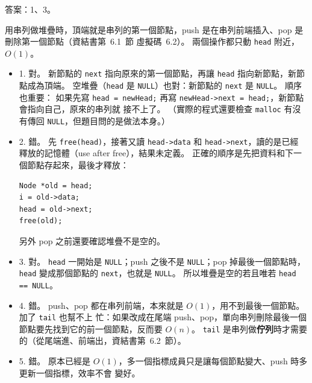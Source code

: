 \begin{pastsoln}
答案：1、3。

用串列做堆疊時，頂端就是串列的第一個節點，push 是在串列前端插入、pop 是刪除第一個節點（資結書第~6.1~節
虛擬碼~6.2）。 兩個操作都只動 \texttt{head} 附近，$O(1)$。

\begin{itemize}
\item 1. 對。 新節點的 \texttt{next} 指向原來的第一個節點，再讓 \texttt{head} 指向新節點，新節點成為頂端。
空堆疊（\texttt{head} 是 \texttt{NULL}）也對：新節點的 \texttt{next} 是 \texttt{NULL}。 順序也重要：
如果先寫 \texttt{head = newHead;} 再寫 \texttt{newHead->next = head;}，新節點會指向自己，原來的串列就
接不上了。 （實際的程式還要檢查 \texttt{malloc} 有沒有傳回 \texttt{NULL}，但題目問的是做法本身。）
\item 2. 錯。 先 \texttt{free(head)}，接著又讀 \texttt{head->data} 和 \texttt{head->next}，讀的是已經
釋放的記憶體（use after free），結果未定義。 正確的順序是先把資料和下一個節點存起來，最後才釋放：
\begin{verbatim}
Node *old = head;
i = old->data;
head = old->next;
free(old);
\end{verbatim}
另外 pop 之前還要確認堆疊不是空的。
\item 3. 對。 \texttt{head} 一開始是 \texttt{NULL}；push 之後不是 \texttt{NULL}；pop 掉最後一個節點時，
\texttt{head} 變成那個節點的 \texttt{next}，也就是 \texttt{NULL}。 所以堆疊是空的若且唯若
\texttt{head == NULL}。
\item 4. 錯。 push、pop 都在串列前端，本來就是 $O(1)$，用不到最後一個節點。 加了 \texttt{tail} 也幫不上
忙：如果改成在尾端 push、pop，單向串列刪除最後一個節點要先找到它的前一個節點，反而要 $O(n)$。
\texttt{tail} 是串列做\textbf{佇列}時才需要的（從尾端進、前端出，資結書第~6.2~節）。
\item 5. 錯。 原本已經是 $O(1)$，多一個指標成員只是讓每個節點變大、push 時多更新一個指標，效率不會
變好。
\end{itemize}
\end{pastsoln}

